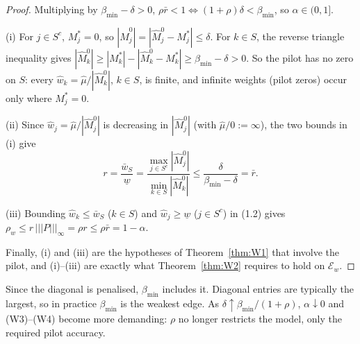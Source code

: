 \documentclass[11pt,a4paper]{article}
\numberwithin{equation}{section}
\theoremstyle{plain}
\theoremstyle{remark}
\begin{document}
\begin{proof}
Multiplying by $\beta_{\min}-\delta>0$, $\rho\bar r<1\iff(1+\rho)\delta<\beta_{\min}$, so $\alpha\in(0,1]$.

(i) For $j\in S^c$, $M^*_j=0$, so $|\hat M^0_j|=|\hat M^0_j-M^*_j|\le\delta$. For $k\in S$, the
reverse triangle inequality gives
$|\hat M^0_k|\ge|M^*_k|-|\hat M^0_k-M^*_k|\ge\beta_{\min}-\delta>0$.
So the pilot has no zero on $S$: every $\hat w_k=\hat\mu/|\hat M^0_k|$, $k\in S$, is finite, and
infinite weights (pilot zeros) occur only where $M^*_j=0$.

(ii) Since $\hat w_j=\hat\mu/|\hat M^0_j|$ is decreasing in $|\hat M^0_j|$ (with $\hat\mu/0:=\infty$),
the two bounds in (i) give
\[
  r=\frac{\bar w_S}{\underline w}
   =\frac{\max_{j\in S^c}|\hat M^0_j|}{\min_{k\in S}|\hat M^0_k|}
   \le\frac{\delta}{\beta_{\min}-\delta}=\bar r .
\]

(iii) Bounding $\hat w_k\le\bar w_S$ ($k\in S$) and $\hat w_j\ge\underline w$ ($j\in S^c$) in (1.2)
gives $\rho_w\le r\,|||P|||_\infty=\rho r\le\rho\bar r=1-\alpha$.

Finally, (i) and (iii) are the hypotheses of Theorem~\ref{thm:W1} that involve the pilot, and
(i)--(iii) are exactly what Theorem~\ref{thm:W2} requires to hold on $\mathcal E_w$.
\end{proof}

\noindent
Since the diagonal is penalised, $\beta_{\min}$ includes it. Diagonal entries are typically the
largest, so in practice $\beta_{\min}$ is the weakest edge. As $\delta\uparrow\beta_{\min}/(1+\rho)$,
$\alpha\downarrow0$ and (W3)--(W4) become more demanding: $\rho$ no longer restricts the model,
only the required pilot accuracy.
\end{document}
